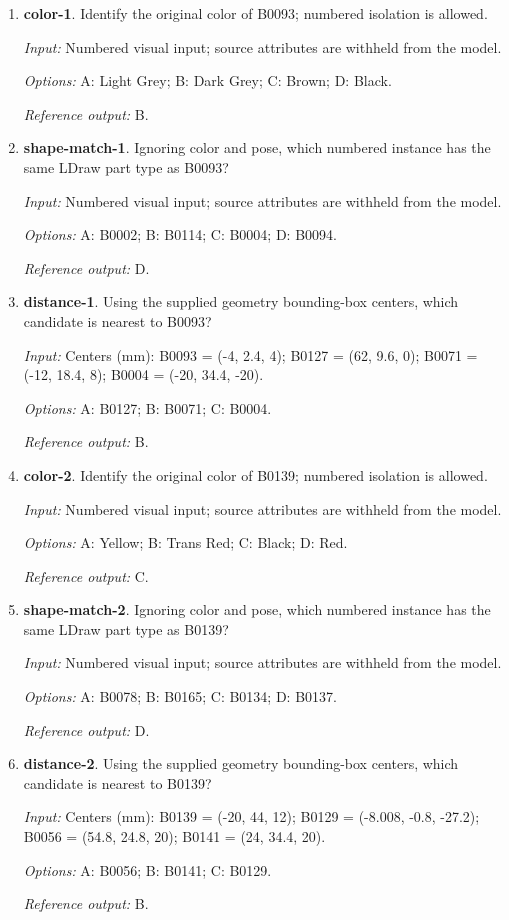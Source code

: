 \begin{enumerate}
\item \textbf{color-1}. Identify the original color of B0093; numbered isolation is allowed.\par {\small \textit{Input:} Numbered visual input; source attributes are withheld from the model. \par\textit{Options:} A: Light Grey; B: Dark Grey; C: Brown; D: Black. \par\textit{Reference output:} B.}
\item \textbf{shape-match-1}. Ignoring color and pose, which numbered instance has the same LDraw part type as B0093?\par {\small \textit{Input:} Numbered visual input; source attributes are withheld from the model. \par\textit{Options:} A: B0002; B: B0114; C: B0004; D: B0094. \par\textit{Reference output:} D.}
\item \textbf{distance-1}. Using the supplied geometry bounding-box centers, which candidate is nearest to B0093?\par {\small \textit{Input:} Centers (mm): B0093 = (-4, 2.4, 4); B0127 = (62, 9.6, 0); B0071 = (-12, 18.4, 8); B0004 = (-20, 34.4, -20). \par\textit{Options:} A: B0127; B: B0071; C: B0004. \par\textit{Reference output:} B.}
\item \textbf{color-2}. Identify the original color of B0139; numbered isolation is allowed.\par {\small \textit{Input:} Numbered visual input; source attributes are withheld from the model. \par\textit{Options:} A: Yellow; B: Trans Red; C: Black; D: Red. \par\textit{Reference output:} C.}
\item \textbf{shape-match-2}. Ignoring color and pose, which numbered instance has the same LDraw part type as B0139?\par {\small \textit{Input:} Numbered visual input; source attributes are withheld from the model. \par\textit{Options:} A: B0078; B: B0165; C: B0134; D: B0137. \par\textit{Reference output:} D.}
\item \textbf{distance-2}. Using the supplied geometry bounding-box centers, which candidate is nearest to B0139?\par {\small \textit{Input:} Centers (mm): B0139 = (-20, 44, 12); B0129 = (-8.008, -0.8, -27.2); B0056 = (54.8, 24.8, 20); B0141 = (24, 34.4, 20). \par\textit{Options:} A: B0056; B: B0141; C: B0129. \par\textit{Reference output:} B.}

\end{enumerate}
